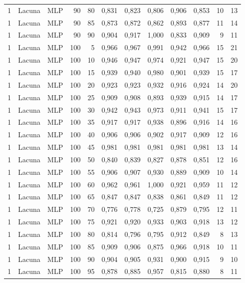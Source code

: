 \begin{longtable}{@{}rllrrrrrrrrr@{}}
1 & Lacuna & MLP & 90 & 80 & 0,831 & 0,823 & 0,806 & 0,906 & 0,853 & 10 & 13 \\
1 & Lacuna & MLP & 90 & 85 & 0,873 & 0,872 & 0,862 & 0,893 & 0,877 & 11 & 14 \\
1 & Lacuna & MLP & 90 & 90 & 0,904 & 0,917 & 1,000 & 0,833 & 0,909 & 9 & 11 \\
1 & Lacuna & MLP & 100 & 5 & 0,966 & 0,967 & 0,991 & 0,942 & 0,966 & 15 & 21 \\
1 & Lacuna & MLP & 100 & 10 & 0,946 & 0,947 & 0,974 & 0,921 & 0,947 & 15 & 20 \\
1 & Lacuna & MLP & 100 & 15 & 0,939 & 0,940 & 0,980 & 0,901 & 0,939 & 15 & 17 \\
1 & Lacuna & MLP & 100 & 20 & 0,923 & 0,923 & 0,932 & 0,916 & 0,924 & 14 & 20 \\
1 & Lacuna & MLP & 100 & 25 & 0,909 & 0,908 & 0,893 & 0,939 & 0,915 & 14 & 17 \\
1 & Lacuna & MLP & 100 & 30 & 0,942 & 0,943 & 0,973 & 0,911 & 0,941 & 15 & 17 \\
1 & Lacuna & MLP & 100 & 35 & 0,917 & 0,917 & 0,938 & 0,896 & 0,916 & 14 & 16 \\
1 & Lacuna & MLP & 100 & 40 & 0,906 & 0,906 & 0,902 & 0,917 & 0,909 & 12 & 16 \\
1 & Lacuna & MLP & 100 & 45 & 0,981 & 0,981 & 0,981 & 0,981 & 0,981 & 13 & 14 \\
1 & Lacuna & MLP & 100 & 50 & 0,840 & 0,839 & 0,827 & 0,878 & 0,851 & 12 & 16 \\
1 & Lacuna & MLP & 100 & 55 & 0,906 & 0,907 & 0,930 & 0,889 & 0,909 & 10 & 14 \\
1 & Lacuna & MLP & 100 & 60 & 0,962 & 0,961 & 1,000 & 0,921 & 0,959 & 11 & 12 \\
1 & Lacuna & MLP & 100 & 65 & 0,847 & 0,847 & 0,838 & 0,861 & 0,849 & 11 & 12 \\
1 & Lacuna & MLP & 100 & 70 & 0,776 & 0,778 & 0,725 & 0,879 & 0,795 & 12 & 11 \\
1 & Lacuna & MLP & 100 & 75 & 0,921 & 0,920 & 0,933 & 0,903 & 0,918 & 13 & 12 \\
1 & Lacuna & MLP & 100 & 80 & 0,814 & 0,796 & 0,795 & 0,912 & 0,849 & 8 & 13 \\
1 & Lacuna & MLP & 100 & 85 & 0,909 & 0,906 & 0,875 & 0,966 & 0,918 & 10 & 11 \\
1 & Lacuna & MLP & 100 & 90 & 0,904 & 0,905 & 0,931 & 0,900 & 0,915 & 9 & 10 \\
1 & Lacuna & MLP & 100 & 95 & 0,878 & 0,885 & 0,957 & 0,815 & 0,880 & 8 & 11 \\

\end{longtable}
